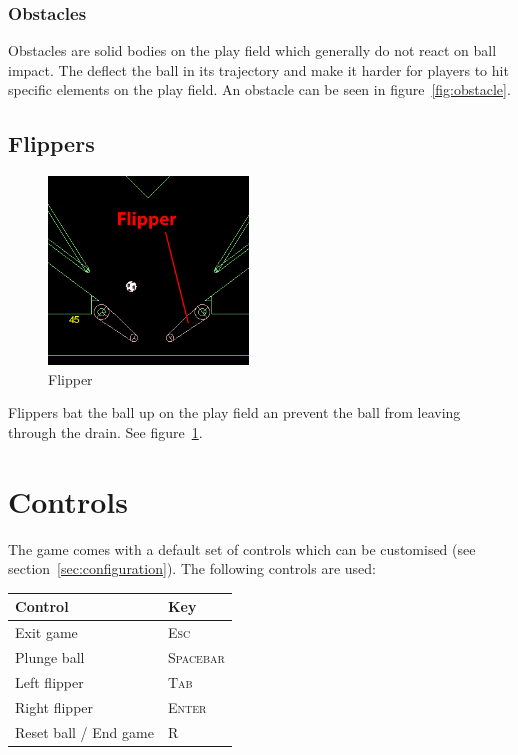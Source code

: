 \documentclass[fontsize=12pt,
               paper=a4,
               twoside=false,
               parskip=half,
               ]{scrartcl}
\begin{document}
\subsubsection{Obstacles}

Obstacles are solid bodies on the play field which generally do not react on ball impact. The deflect the ball in its trajectory and make it harder for players to hit specific elements on the play field. An obstacle can be seen in figure~\ref{fig:obstacle}.

\subsection{Flippers}

\begin{figure}[h!]
	\centering
	\includegraphics[height=5cm]{./img/manual/flipper.png}
	\caption[Flipper]{Flipper}
	\label{fig:flipper}
\end{figure}

Flippers bat the ball up on the play field an prevent the ball from leaving through the drain. See figure~\ref{fig:flipper}.

\section{Controls}

The game comes with a default set of controls which can be customised (see section~\ref{sec:configuration}). The following controls are used:

\begin{tabular}{ | l | l | }
\hline
\textbf{Control} & \textbf{Key} \\ \hline
Exit game & \textsc{Esc}  \\ \hline
Plunge ball & \textsc{Spacebar}  \\ \hline
Left flipper & \textsc{Tab}  \\ \hline
Right flipper & \textsc{Enter}  \\ \hline
Reset ball / End game & \textsc{R}  \\ \hline

\end{tabular}
\end{document}
